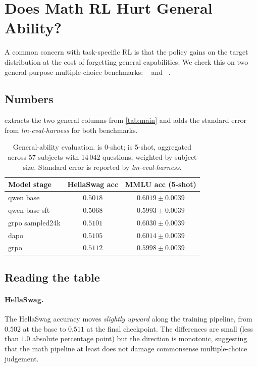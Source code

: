 \section{Does Math RL Hurt General Ability?}
\label{sec:general}

A common concern with task-specific RL is that the policy gains on the
target distribution at the cost of forgetting general capabilities. We
check this on two general-purpose multiple-choice benchmarks:
~\cite{hellaswag} and ~\cite{mmlu}.

\subsection{Numbers}
 extracts the two general columns from
\cref{tab:main} and adds the standard error from
\emph{lm-eval-harness} for both benchmarks.

\begin{table}[h]
\centering
\small
\begin{tabular}{lcc}
\toprule
\textbf{Model stage} & \textbf{HellaSwag acc} & \textbf{MMLU acc (5-shot)} \\
\midrule
qwen base       & $0.5018$            & $0.6019 \pm 0.0039$ \\
qwen base sft   & $0.5068$            & $0.5993 \pm 0.0039$ \\
grpo sampled24k & $0.5101$            & $0.6030 \pm 0.0039$ \\
dapo            & $0.5105$            & $0.6014 \pm 0.0039$ \\
grpo            & $0.5112$            & $0.5998 \pm 0.0039$ \\
\bottomrule
\end{tabular}
\caption{General-ability evaluation.  is 0-shot;
 is 5-shot, aggregated across 57 subjects with 14\,042
questions, weighted by subject size. Standard error is reported by
\emph{lm-eval-harness}.}
\label{tab:general}
\end{table}

\subsection{Reading the table}
\paragraph{HellaSwag.}
The HellaSwag accuracy moves \emph{slightly upward} along the
training pipeline, from $0.502$ at the base to $0.511$ at the final
 checkpoint. The differences are small (less than $1.0$
absolute percentage point) but the direction is monotonic, suggesting
that the math pipeline at least does not damage commonsense
multiple-choice judgement.

